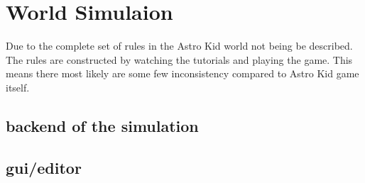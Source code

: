 \section{World Simulaion}
	Due to the complete set of rules in the Astro Kid world not being be described. The rules are constructed by watching the tutorials and playing the game. This means there most likely are some few inconsistency compared to Astro Kid game itself.


	\subsection{backend of the simulation}
	
	\subsection{gui/editor}